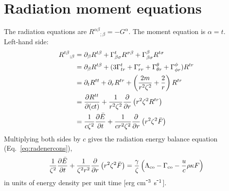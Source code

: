 \documentclass[../main.tex]{subfiles}
\begin{document}
\section*{Radiation moment equations}
The radiation equations are $R^{\alpha\beta}{}_{;\beta}=-G^\alpha$.  The moment equation is $\alpha=t$.\\
Left-hand side:
\begingroup
\allowdisplaybreaks
\begin{align*}
    R^{t\beta}{}_{;\beta}&=\partial_\beta R^{t\beta}+\Gamma^{t}_{\beta\sigma}R^{\sigma\beta}+\Gamma^{\beta}_{\beta\sigma}R^{t\sigma}\\
    &=\partial_\beta R^{t\beta}+(3\Gamma^{t}_{tr}+\Gamma^{r}_{rr}+\Gamma^{\theta}_{\theta r}+\Gamma^{\phi}_{\phi r})R^{tr}\\
    &=\partial_t R^{tt}+\partial_r R^{tr}+\left(\frac{2m}{r^2\zeta^2}+\frac{2}{r}\right)R^{tr}\\
    &=\frac{\partial R^{tt}}{\partial(ct)}+\frac{1}{r^2\zeta^2}\frac{\partial}{\partial r}\left(r^2\zeta^2R^{tr}\right)\\
    &=\frac{1}{c\zeta^2}\frac{\partial \bar{E}}{\partial t}+\frac{1}{cr^2\zeta^2}\frac{\partial}{\partial r}\left(r^2\zeta^2\bar{F}\right)
\end{align*}
\endgroup
Multiplying both sides by $c$ gives the radiation energy balance equation (Eq.~\ref{eq:radenercons}),
\begin{equation}
    \frac{1}{\zeta^2}\frac{\partial \bar{E}}{\partial t}+\frac{1}{\zeta^2r^2}\frac{\partial}{\partial r}\left(r^2\zeta^2\bar{F}\right)=\frac{\gamma}{\zeta}\left(\Lambda_\text{co}-\Gamma_\text{co}-\frac{u}{c}\rho\kappa F\right)
\end{equation}
in units of energy density per unit time [erg cm$^{\-3}$ s$^{\-1}$].\\
\end{document}
